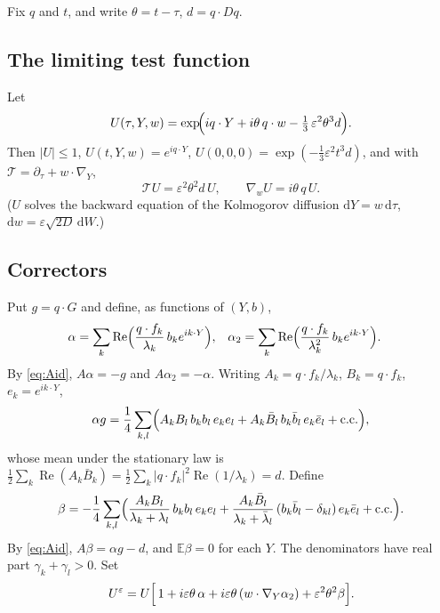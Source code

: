 \documentclass[11pt]{article}
\newcommand{\dd}{\mathrm{d}}
\newcommand{\E}{\mathbb{E}}
\newcommand{\eps}{\varepsilon}
\newcommand{\cT}{\mathcal{T}}
\renewcommand{\Re}{\operatorname{Re}}
\theoremstyle{remark}
\begin{document}
Fix $q$ and $t$, and write $\theta = t-\tau$, $d = q\cdot Dq$.

\subsection{The limiting test function}

Let
\begin{equation}
  U(\tau,Y,w) = \exp\!\Bigl(iq\cdot Y + i\theta\,q\cdot w
     - \tfrac13\,\eps^2\theta^3 d\Bigr).
\end{equation}
Then $|U|\le1$, $U(t,Y,w) = e^{iq\cdot Y}$,
$U(0,0,0) = \exp(-\tfrac13\eps^2t^3d)$, and with
$\cT = \partial_\tau + w\cdot\nabla_Y$,
\begin{equation}
  \cT U = \eps^2\theta^2 d\,U, \qquad \nabla_wU = i\theta\,q\,U .
  \label{eq:Uid}
\end{equation}
($U$ solves the backward equation of the Kolmogorov diffusion
$\dd Y = w\,\dd\tau$, $\dd w = \eps\sqrt{2D}\,\dd W$.)

\subsection{Correctors}

Put $g = q\cdot G$ and define, as functions of $(Y,b)$,
\begin{align*}
  \alpha &= \sum_k\Re\Bigl(\frac{q\cdot f_k}{\lambda_k}\,b_ke^{ik\cdot Y}\Bigr),
  &
  \alpha_2 &= \sum_k\Re\Bigl(\frac{q\cdot f_k}{\lambda_k^2}\,b_ke^{ik\cdot Y}\Bigr).
\end{align*}
By \eqref{eq:Aid}, $A\alpha = -g$ and $A\alpha_2 = -\alpha$. Writing
$A_k = q\cdot f_k/\lambda_k$, $B_k = q\cdot f_k$, $e_k = e^{ik\cdot Y}$,
\[
  \alpha g = \frac14\sum_{k,l}\Bigl(A_kB_l\,b_kb_l\,e_ke_l
     + A_k\bar B_l\,b_k\bar b_l\,e_k\bar e_l + \text{c.c.}\Bigr),
\]
whose mean under the stationary law is
$\frac12\sum_k\Re(A_k\bar B_k) = \frac12\sum_k|q\cdot f_k|^2\Re(1/\lambda_k) = d$.
Define
\begin{equation}
  \beta = -\frac14\sum_{k,l}\Bigl(
     \frac{A_kB_l}{\lambda_k+\lambda_l}\,b_kb_l\,e_ke_l
     + \frac{A_k\bar B_l}{\lambda_k+\bar\lambda_l}\,(b_k\bar b_l-\delta_{kl})\,e_k\bar e_l
     + \text{c.c.}\Bigr).
\end{equation}
By \eqref{eq:Aid}, $A\beta = \alpha g - d$, and $\E\beta = 0$ for each $Y$.
The denominators have real part $\gamma_k+\gamma_l>0$. Set
\begin{equation}
  U^\eps = U\Bigl[\,1 + i\eps\theta\,\alpha
     + i\eps\theta\,(w\cdot\nabla_Y\alpha_2) + \eps^2\theta^2\beta\Bigr].
\end{equation}
\end{document}
